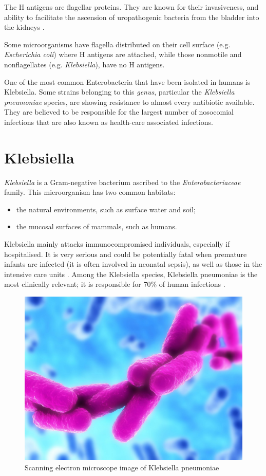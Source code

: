 \documentclass[11pt]{report}
\begin{document}
The H antigens are flagellar proteins. They are known for their invasiveness, and ability to facilitate the ascension of uropathogenic bacteria from the bladder into the kidneys \cite{wiles2008origins}.

Some microorganisms have flagella distributed on their cell surface (e.g. \emph{Escherichia coli}) where H antigens are attached, while those nonmotile and nonflagellates (e.g. \emph{Klebsiella}), have no H antigens.

One of the most common Enterobacteria that have been isolated in humans is Klebsiella.
Some strains belonging to this \emph{genus}, particular the \emph{Klebsiella pneumoniae} species, are showing resistance to almost every antibiotic available.
They are believed to be responsible for the largest number of nosocomial infections that are also known as health-care associated infections.

\clearpage
\section{Klebsiella}
\emph{Klebsiella} is a Gram-negative bacterium ascribed to the \emph{Enterobacteriaceae} family.
This microorganism has two common habitats: 

\begin{itemize}
\item the natural environments, such as surface water and soil;
\item the mucosal surfaces of mammals, such as humans.
\end{itemize}

Klebsiella mainly attacks immunocompromised individuals, especially if hospitalised.
It is very serious and could be potentially fatal when premature infants are infected (it is often involved in neonatal sepsis), as well as those in the intensive care units \cite{podschun1998klebsiella}.
Among the Klebsiella species, Klebsiella pneumoniae is the most clinically relevant; it is responsible for 70$\%$ of human infections \cite{Pitout2015}.

\begin{figure}[htp]
\centering
\includegraphics[scale=0.30]{img/Klebsiella_pneumoniae.jpg}
\caption{Scanning electron microscope image of Klebsiella pneumoniae}
\label{}
\end{figure}
\end{document}
